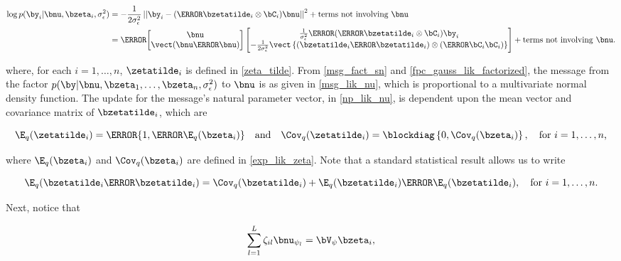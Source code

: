 \documentclass[12pt]{article}
\def\sigsqeps{\sigma^2_{\epsilon}}
\def\Vpsi{\bV_\psi}
\newcommand\nupsi[1]{\bnu_{\psi_{#1}}}
\newcommand\tni[1]{\text{terms not involving $#1$}}
\theoremstyle{plain}
\theoremstyle{definition}
\theoremstyle{remark}
\begin{document}
\begin{align*}
	\log p (\by_i | \bnu, \bzeta_i, \sigsqeps)
		& = -\frac{1}{2\sigsqeps} \left|\left|
			\by_i - (\T{\bzetatilde_i} \otimes \bC_i) \bnu
		\right|\right|^2 + \tni{\bnu} \\
		& = \T{\begin{bmatrix}
			\bnu \\
			\vect (\bnu \T{\bnu})
		\end{bmatrix}} \begin{bmatrix}
			\frac{1}{\sigsqeps} \T{(\T{\bzetatilde_i} \otimes \bC_i)} \by_i \\
			-\frac{1}{2\sigsqeps} \vect \left\{
				(\bzetatilde_i \T{\bzetatilde_i}) \otimes (\T{\bC_i} \bC_i)
			\right\}
		\end{bmatrix} + \tni{\bnu}.
\end{align*}

\noindent where, for each $i = 1, \dots, n$, $\zetatilde_i$ is defined in \eqref{zeta_tilde}.
From \eqref{msg_fact_sn} and \eqref{fpc_gauss_lik_factorized}, the message from the factor $p (\by | \bnu,
\bzeta_1, \dots, \bzeta_n, \sigsqeps)$ to $\bnu$ is as given in \eqref{msg_lik_nu}, which is proportional to a
multivariate normal density function. The update for the message's natural parameter vector,
in \eqref{np_lik_nu}, is dependent upon
the mean vector and covariance matrix of $\bzetatilde_i$, which are

\begin{equation}
	\E_q (\zetatilde_i) = \T{\{ 1, \T{\E_q (\bzeta_i)} \}} \quad
	\text{and} \quad
	\Cov_q (\zetatilde_i) = \blockdiag \left\{ 0, \Cov_q (\bzeta_i) \right\}, \quad
	\text{for $i = 1, \dots, n$,}
\label{exp_lik_zeta_tilde}
\end{equation}

\noindent where $\E_q (\bzeta_i)$ and $\Cov_q (\bzeta_i)$ are defined in \eqref{exp_lik_zeta}. Note that
a standard statistical result allows us to write

\begin{equation}
	\E_q (\bzetatilde_i \T{\bzetatilde_i}) =
		\Cov_q (\bzetatilde_i) + \E_q (\bzetatilde_i) \T{\E_q (\bzetatilde_i)}, \quad \text{for $i = 1, \dots, n$.}
\label{E_q_outer_zeta}
\end{equation}

Next, notice that

\begin{equation}
	\sum_{l=1}^L \zeta_{il} \nupsi{l} = \Vpsi \bzeta_i,
\label{zeta_simplification}
\end{equation}
\end{document}
